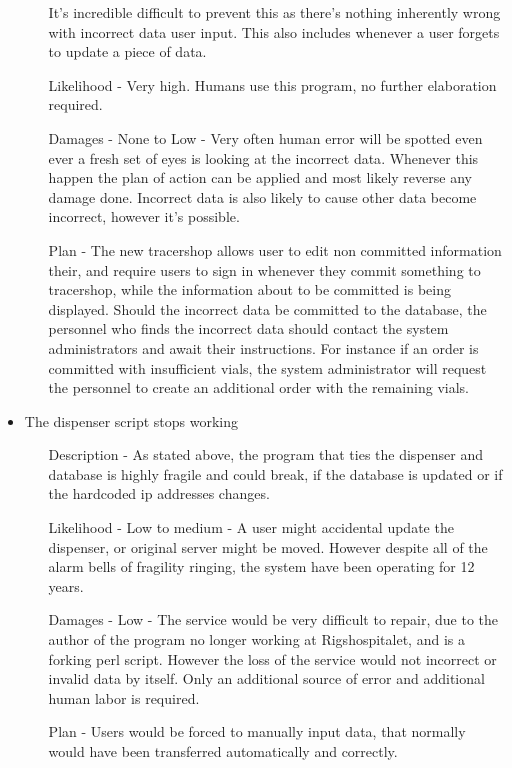 \documentclass{article}
\begin{document}
\begin{itemize}
\begin{itemize}
    It's incredible difficult to prevent this as there's nothing inherently wrong with \gls{incorrect data} user input. This also includes whenever a user forgets to update a piece of data.
    \item[Likelihood] - Very high. Humans use this program, no further elaboration required.
    \item[Damages] - None to Low - Very often human error will be spotted even ever a fresh set of eyes is looking at the \gls{incorrect data}.
    Whenever this happen the plan of action can be applied and most likely reverse any damage done. Incorrect data is also likely to cause other data become incorrect, however it's possible.
    \item[Plan] - The new tracershop allows user to edit non committed information their, and require users to sign in whenever they commit something to tracershop, while the information about to be committed is being displayed.
    Should the incorrect data be committed to the database, the personnel who finds the incorrect data should contact the system administrators and await their instructions.
    For instance if an order is committed with insufficient vials, the system administrator will request the personnel to create an additional order with the remaining vials.
  \end{itemize}
  \item The dispenser script stops working
  \begin{itemize}
    \item[Description] - As stated above, the program that ties the dispenser and database is highly fragile and could break, if the database is updated or if the hardcoded ip addresses changes.
    \item[Likelihood] - Low to medium - A user might accidental update the dispenser, or original server might be moved. However despite all of the alarm bells of fragility ringing, the system have been operating for 12 years.
    \item[Damages] - Low - The service would be very difficult to repair, due to the author of the program no longer working at Rigshospitalet, and is a forking perl script.
    However the loss of the service would not incorrect or \gls{invalid data} by itself. Only an additional source of error and additional human labor is required.
    \item[Plan] - Users would be forced to manually input data, that normally would have been transferred automatically and correctly.
  \end{itemize}

\end{itemize}
\end{document}
